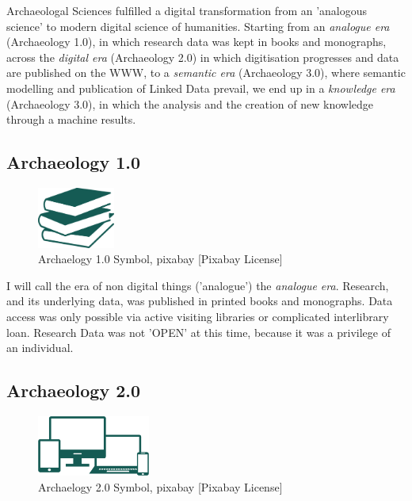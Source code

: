 \documentclass[twocolumn]{autart}
\begin{document}
Archaeologal Sciences fulfilled a digital transformation from an 'analogous science' to modern digital science of humanities. Starting from an \textit{analogue era} (Archaeology 1.0), in which research data was kept in books and monographs, across the \textit{digital era} (Archaeology 2.0) in which digitisation progresses and data are published on the WWW, to a \textit{semantic era} (Archaeology 3.0), where semantic modelling and publication of Linked Data prevail, we end up in a \textit{knowledge era} (Archaeology 3.0), in which the analysis and the creation of new knowledge through a machine results.

\subsection{Archaeology 1.0}

\begin{figure}[!htb]
\begin{center}
\includegraphics[height=2cm]{a10.png}    %
\caption{Archaelogy 1.0 Symbol, pixabay [Pixabay License]}  %
\label{figa10symbol}                                 %
\end{center}                                 %
\end{figure}

I will call the era of non digital things ('analogue') the \textit{analogue era}. Research, and its underlying data, was published in printed books and monographs. Data access was only possible via active visiting libraries or complicated interlibrary loan. Research Data was not 'OPEN' at this time, because it was a privilege of an individual. 

\subsection{Archaeology 2.0}

\begin{figure}[!htb]
\begin{center}
\includegraphics[height=2cm]{a20.png}    %
\caption{Archaelogy 2.0 Symbol, pixabay [Pixabay License]}  %
\label{figa20symbol}                                 %
\end{center}                                 %
\end{figure}
\end{document}
